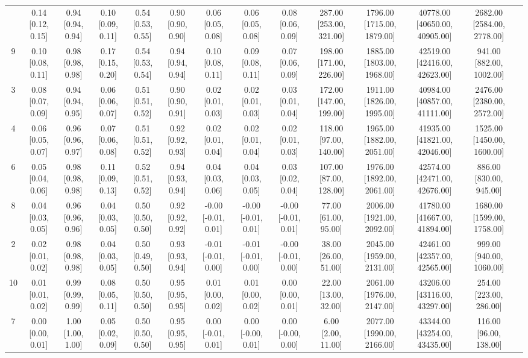 \documentclass[8pt]{article}
\begin{document}
\begin{center}
\begin{footnotesize}
\begin{longtable}{|cccccccccccccc|}
\bottomrule
\endlastfoot
 5 & 0.14 [0.12, 0.15] & 0.94 [0.94, 0.94] & 0.10 [0.09, 0.11] & 0.54 [0.53, 0.55] & 0.90 [0.90, 0.90] &   0.06 [0.05, 0.08] &   0.06 [0.05, 0.08] &   0.08 [0.06, 0.09] & 287.00 [253.00, 321.00] & 1796.00 [1715.00, 1879.00] & 40778.00 [40650.00, 40905.00] & 2682.00 [2584.00, 2778.00] \\
 9 & 0.10 [0.08, 0.11] & 0.98 [0.98, 0.98] & 0.17 [0.15, 0.20] & 0.54 [0.53, 0.54] & 0.94 [0.94, 0.94] &   0.10 [0.08, 0.11] &   0.09 [0.08, 0.11] &   0.07 [0.06, 0.09] & 198.00 [171.00, 226.00] & 1885.00 [1803.00, 1968.00] & 42519.00 [42416.00, 42623.00] &   941.00 [882.00, 1002.00] \\
 3 & 0.08 [0.07, 0.09] & 0.94 [0.94, 0.95] & 0.06 [0.06, 0.07] & 0.51 [0.51, 0.52] & 0.90 [0.90, 0.91] &   0.02 [0.01, 0.03] &   0.02 [0.01, 0.03] &   0.03 [0.01, 0.04] & 172.00 [147.00, 199.00] & 1911.00 [1826.00, 1995.00] & 40984.00 [40857.00, 41111.00] & 2476.00 [2380.00, 2572.00] \\
 4 & 0.06 [0.05, 0.07] & 0.96 [0.96, 0.97] & 0.07 [0.06, 0.08] & 0.51 [0.51, 0.52] & 0.92 [0.92, 0.93] &   0.02 [0.01, 0.04] &   0.02 [0.01, 0.04] &   0.02 [0.01, 0.03] &  118.00 [97.00, 140.00] & 1965.00 [1882.00, 2051.00] & 41935.00 [41821.00, 42046.00] & 1525.00 [1450.00, 1600.00] \\
 6 & 0.05 [0.04, 0.06] & 0.98 [0.98, 0.98] & 0.11 [0.09, 0.13] & 0.52 [0.51, 0.52] & 0.94 [0.93, 0.94] &   0.04 [0.03, 0.06] &   0.04 [0.03, 0.05] &   0.03 [0.02, 0.04] &  107.00 [87.00, 128.00] & 1976.00 [1892.00, 2061.00] & 42574.00 [42471.00, 42676.00] &    886.00 [830.00, 945.00] \\
 8 & 0.04 [0.03, 0.05] & 0.96 [0.96, 0.96] & 0.04 [0.03, 0.05] & 0.50 [0.50, 0.50] & 0.92 [0.92, 0.92] & -0.00 [-0.01, 0.01] & -0.00 [-0.01, 0.01] & -0.00 [-0.01, 0.01] &    77.00 [61.00, 95.00] & 2006.00 [1921.00, 2092.00] & 41780.00 [41667.00, 41894.00] & 1680.00 [1599.00, 1758.00] \\
 2 & 0.02 [0.01, 0.02] & 0.98 [0.98, 0.98] & 0.04 [0.03, 0.05] & 0.50 [0.49, 0.50] & 0.93 [0.93, 0.94] & -0.01 [-0.01, 0.00] & -0.01 [-0.01, 0.00] & -0.00 [-0.01, 0.00] &    38.00 [26.00, 51.00] & 2045.00 [1959.00, 2131.00] & 42461.00 [42357.00, 42565.00] &   999.00 [940.00, 1060.00] \\
10 & 0.01 [0.01, 0.02] & 0.99 [0.99, 0.99] & 0.08 [0.05, 0.11] & 0.50 [0.50, 0.50] & 0.95 [0.95, 0.95] &   0.01 [0.00, 0.02] &   0.01 [0.00, 0.02] &   0.00 [0.00, 0.01] &    22.00 [13.00, 32.00] & 2061.00 [1976.00, 2147.00] & 43206.00 [43116.00, 43297.00] &    254.00 [223.00, 286.00] \\
 7 & 0.00 [0.00, 0.01] & 1.00 [1.00, 1.00] & 0.05 [0.02, 0.09] & 0.50 [0.50, 0.50] & 0.95 [0.95, 0.95] &  0.00 [-0.01, 0.01] &  0.00 [-0.00, 0.01] &  0.00 [-0.00, 0.00] &      6.00 [2.00, 11.00] & 2077.00 [1990.00, 2166.00] & 43344.00 [43254.00, 43435.00] &     116.00 [96.00, 138.00] \\
\end{longtable}
\end{footnotesize}
\end{center}
\end{document}
